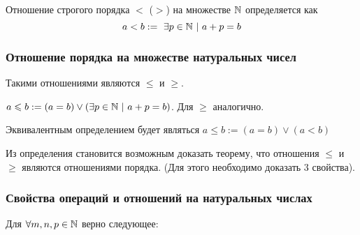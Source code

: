 \begin{definition}
    Отношение строгого порядка $<$ ($>$) на множестве $\mathbb{N}$ определяется как
    $$
        a < b :=\ \exists p \in \mathbb{N}\ |\ a + p = b
    $$
\end{definition}

\subsubsection{Отношение порядка на множестве натуральных чисел}

Такими отношениями являются $\le$ и $\ge$.
\begin{definition}
    $a \le b := (a = b) \vee (\exists p \in \N\ |\ a + p = b)$. Для $\ge$ аналогично.
\end{definition}

\begin{anote}
    Эквивалентным определением будет являться $a \le b := (a = b) \vee (a < b)$
\end{anote}

Из определения становится возможным доказать теорему, что отношения $\le$ и $\ge$ являются отношениями порядка. (Для этого необходимо доказать 3 свойства).

\subsubsection{Свойства операций и отношений на натуральных числах}

Для $\forall m, n, p \in \mathbb{N}$ верно следующее:

